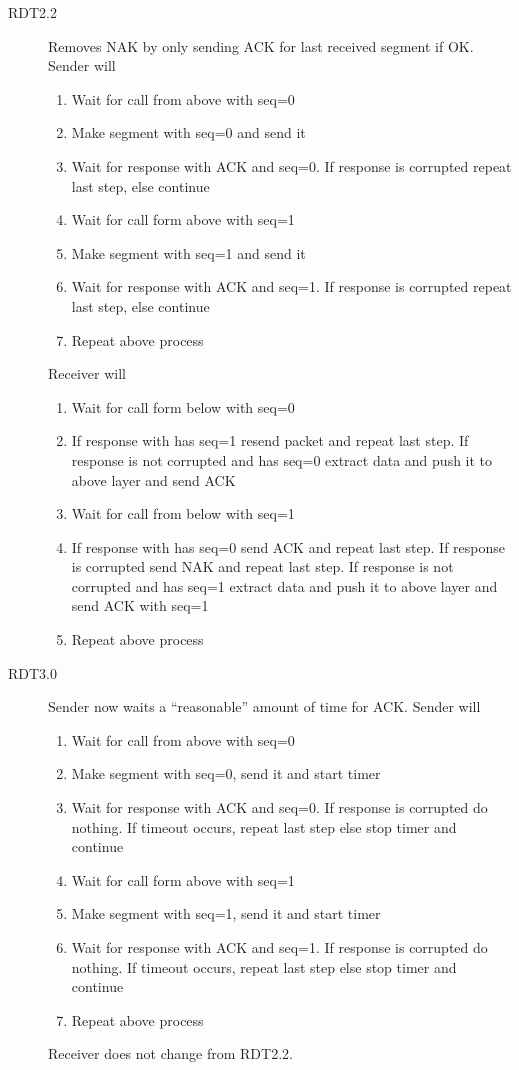\documentclass{article}
\begin{document}
\begin{description}
    \item[RDT2.2] Removes NAK by only sending ACK for last received segment if OK. Sender will
    \begin{enumerate}
        \item Wait for call from above with seq=0
        \item Make segment with seq=0 and send it
        \item Wait for response with ACK and seq=0. If response is corrupted repeat last step,
        else continue
        \item Wait for call form above with seq=1
        \item Make segment with seq=1 and send it
        \item Wait for response with ACK and seq=1. If response is corrupted repeat last step,
        else continue
        \item Repeat above process
    \end{enumerate}
    Receiver will
    \begin{enumerate}
        \item Wait for call form below with seq=0
        \item If response with has seq=1 resend packet and repeat last step. If response is not
        corrupted and has seq=0 extract data and push it to above layer and send ACK
        \item Wait for call from below with seq=1
        \item If response with has seq=0 send ACK and repeat last step. If response is corrupted send 
        NAK and repeat last step. If response is not corrupted and has seq=1 extract data and push it 
        to above layer and send ACK with seq=1
        \item Repeat above process
    \end{enumerate}
    
    \item[RDT3.0] Sender now waits a ``reasonable'' amount of time for ACK. Sender will
    \begin{enumerate}
        \item Wait for call from above with seq=0
        \item Make segment with seq=0, send it and start timer
        \item Wait for response with ACK and seq=0. If response is corrupted do nothing. If timeout occurs, repeat last step else stop timer and continue
        \item Wait for call form above with seq=1
        \item Make segment with seq=1, send it and start timer
        \item Wait for response with ACK and seq=1. If response is corrupted do nothing. If timeout
        occurs, repeat last step else stop timer and continue
        \item Repeat above process 
    \end{enumerate}
    Receiver does not change from RDT2.2.
    

\end{description}
\end{document}
